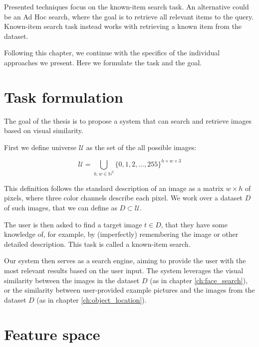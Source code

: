 Presented techniques focus on the known-item search task. An alternative could be an Ad Hoc search, where the goal is to retrieve all relevant items to the query. Known-item search task instead works with retrieving a known item from the dataset.

Following this chapter, we continue with the specifics of the individual approaches we present. Here we formulate the task and the goal.


\section{Task formulation}
\label{s:task_formulation_preliminaries}

The goal of the thesis is to propose a system that can search and retrieve images based on visual similarity.  

First we define universe $\mathcal{U}$ as the set of the all possible images:

$$
    \mathcal{U} = \bigcup_{h,w \in \mathbb{N}^2} \{0, 1, 2, \ldots, 255 \}^{h \times w \times 3}
$$

This definition follows the standard description of an image as a matrix $w \times h$ of pixels, where three color channels describe each pixel. We work over a dataset $D$ of such images, that we can define as $D \subset \mathcal{U}$.


The user is then asked to find a target image $t \in D$, that they have some knowledge of, for example, by (imperfectly) remembering the image or other detailed description. This task is called a known-item search.

Our system then serves as a search engine, aiming to provide the user with the most relevant results based on the user input. The system leverages the visual similarity between the images in the dataset $D$ (as in chapter \ref{ch:face_search}), or the similarity between user-provided example pictures and the images from the dataset $D$ (as in chapter \ref{ch:object_location}).

\section{Feature space}

